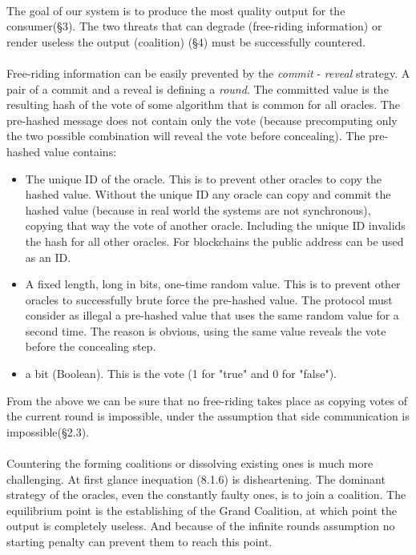 \documentclass{article}
\begin{document}
{\paragraph{ }
The goal of our system is to produce the most quality output for the consumer(§3). The two threats that can degrade (free-riding information) or render useless the output (coalition) (§4) must be successfully countered.
\paragraph{ }
Free-riding information can be easily prevented by the \emph{commit} - \emph{reveal} strategy. A pair of a commit and a reveal is defining a \emph{round}. The committed value is the resulting hash of the vote of some algorithm that is common for all oracles. The pre-hashed message does not contain only the vote (because precomputing only the two possible combination will reveal the vote before concealing). The pre-hashed value contains:
\begin{itemize}
\item The unique ID of the oracle. This is to prevent other oracles to copy the hashed value. Without the unique ID any oracle can copy and commit the hashed value (because in real world the systems are not synchronous), copying that way the vote of another oracle. Including the unique ID invalids the hash for all other oracles. For blockchains the public address can be used as an ID.
\item A fixed length, long in bits, one-time random value. This is to prevent other oracles to successfully brute force the pre-hashed value. The protocol must consider as illegal a pre-hashed value that uses the same random value for a second time. The reason is obvious, using the same value reveals the vote before the concealing step.
\item a bit (Boolean). This is the vote (1 for "true" and 0 for "false").
\end{itemize}
From the above we can be sure that no free-riding takes place as copying votes of the current round is impossible, under the assumption that side communication is impossible(§2.3).
\paragraph{ }
Countering the forming coalitions or dissolving existing ones is much more challenging. At first glance inequation (8.1.6) is disheartening. The dominant strategy of the oracles, even the constantly faulty ones, is to join a coalition. The equilibrium point is the establishing of the Grand Coalition, at which point the output is completely useless. And because of the infinite rounds assumption no starting penalty can prevent them to reach this point. 
}
\end{document}
